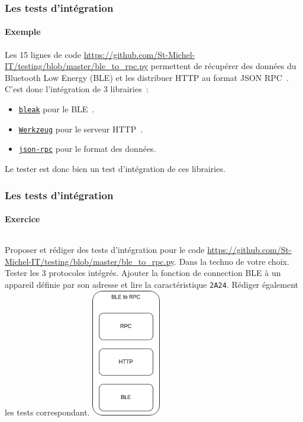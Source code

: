 \documentclass{beamer}
\begin{document}
    \begin{frame}
        \transdissolve
        \frametitle{Les tests d'intégration}
        \framesubtitle{Exemple}

        Les 15 lignes de code \url{https://github.com/St-Michel-IT/testing/blob/master/ble_to_rpc.py} permettent de récupérer des données du Bluetooth Low Energy (BLE) et les distribuer  HTTP au format JSON RPC~.
        \bigbreak
        C'est donc l'intégration de 3 librairies~:
        \begin{itemize}
            \item \href{https://bleak.readthedocs.io/en/latest/index.html}{\lstinline{bleak}} pour le BLE~.
            \item \href{https://werkzeug.palletsprojects.com/en/3.0.x/}{\lstinline{Werkzeug}} pour le serveur HTTP~.
            \item \href{https://github.com/pavlov99/json-rpc}{\lstinline{json-rpc}} pour le format des données.
        \end{itemize}
        \bigbreak
        Le tester est donc bien un test d'intégration de ces librairies.
    \end{frame}

    \begin{frame}
        \transdissolve
        \frametitle{Les tests d'intégration}
        \framesubtitle{Exercice \execcounterdispinc{}}
        \begin{columns}
            Proposer et rédiger des tests d'intégration pour le code \url{https://github.com/St-Michel-IT/testing/blob/master/ble_to_rpc.py}.
            Dans la techno de votre choix.
            \bigbreak
            Tester les 3 protocoles intégrés.
            \bigbreak
            Ajouter la fonction de connection BLE à un appareil définie par son adresse et lire la caractéristique  \lstinline{2A24}.
            Rédiger également les tests correspondant.
            \centering
            \includegraphics[width=3cm]{image/ble-2-rpc-stack.drawio}
        \end{columns}
    \end{frame}
\end{document}
